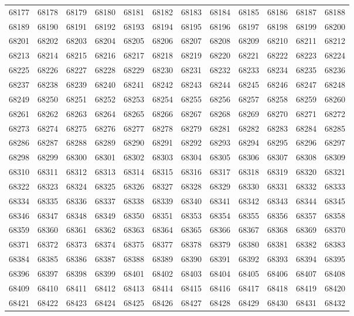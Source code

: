 \begin{center}
\begin{longtable}{llllllllllll}
68177 &68178 &68179 &68180 &68181 &68182 &68183 &68184 &68185 &68186 &68187 &68188 \\
68189 &68190 &68191 &68192 &68193 &68194 &68195 &68196 &68197 &68198 &68199 &68200 \\
68201 &68202 &68203 &68204 &68205 &68206 &68207 &68208 &68209 &68210 &68211 &68212 \\
68213 &68214 &68215 &68216 &68217 &68218 &68219 &68220 &68221 &68222 &68223 &68224 \\
68225 &68226 &68227 &68228 &68229 &68230 &68231 &68232 &68233 &68234 &68235 &68236 \\
68237 &68238 &68239 &68240 &68241 &68242 &68243 &68244 &68245 &68246 &68247 &68248 \\
68249 &68250 &68251 &68252 &68253 &68254 &68255 &68256 &68257 &68258 &68259 &68260 \\
68261 &68262 &68263 &68264 &68265 &68266 &68267 &68268 &68269 &68270 &68271 &68272 \\
68273 &68274 &68275 &68276 &68277 &68278 &68279 &68281 &68282 &68283 &68284 &68285 \\
68286 &68287 &68288 &68289 &68290 &68291 &68292 &68293 &68294 &68295 &68296 &68297 \\
68298 &68299 &68300 &68301 &68302 &68303 &68304 &68305 &68306 &68307 &68308 &68309 \\
68310 &68311 &68312 &68313 &68314 &68315 &68316 &68317 &68318 &68319 &68320 &68321 \\
68322 &68323 &68324 &68325 &68326 &68327 &68328 &68329 &68330 &68331 &68332 &68333 \\
68334 &68335 &68336 &68337 &68338 &68339 &68340 &68341 &68342 &68343 &68344 &68345 \\
68346 &68347 &68348 &68349 &68350 &68351 &68353 &68354 &68355 &68356 &68357 &68358 \\
68359 &68360 &68361 &68362 &68363 &68364 &68365 &68366 &68367 &68368 &68369 &68370 \\
68371 &68372 &68373 &68374 &68375 &68377 &68378 &68379 &68380 &68381 &68382 &68383 \\
68384 &68385 &68386 &68387 &68388 &68389 &68390 &68391 &68392 &68393 &68394 &68395 \\
68396 &68397 &68398 &68399 &68401 &68402 &68403 &68404 &68405 &68406 &68407 &68408 \\
68409 &68410 &68411 &68412 &68413 &68414 &68415 &68416 &68417 &68418 &68419 &68420 \\
68421 &68422 &68423 &68424 &68425 &68426 &68427 &68428 &68429 &68430 &68431 &68432 \\

\end{longtable}
\end{center}

